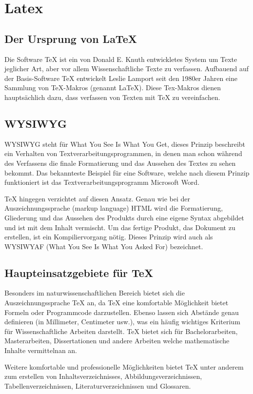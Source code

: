 \chapter{Latex}
    \section{Der Ursprung von LaTeX}
    Die Software TeX ist ein von Donald E. Knuth entwickletes System um Texte jeglicher Art, aber vor allem Wissenschaftliche Texte zu verfassen. Aufbauend auf der Basis-Software TeX entwickelt Leslie Lamport seit den 1980er Jahren eine Sammlung von TeX-Makros (genannt LaTeX). Diese Tex-Makros dienen hauptsächlich dazu, dass verfassen von Texten mit TeX zu vereinfachen.

    \section{WYSIWYG}
    WYSIWYG steht für What You See Is What You Get, dieses Prinzip beschreibt ein Verhalten von Textverarbeitungsprogrammen, in denen man schon während des Verfassens die finale Formatierung und das Aussehen des Textes zu sehen bekommt. Das bekannteste Beispiel für eine Software, welche nach diesem Prinzip funktioniert ist das Textverarbeitungsprogramm Microsoft Word.

    TeX hingegen verzichtet auf diesen Ansatz. Genau wie bei der Auszeichnungssprache (markup language) HTML wird die Formatierung, Gliederung und das Aussehen des Produkts durch eine eigene Syntax abgebildet und ist mit dem Inhalt vermischt. Um das fertige Produkt, das Dokument zu erstellen, ist ein Kompiliervorgang nötig. Dieses Prinzip wird auch als WYSIWYAF (What You See Is What You Asked For) bezeichnet.

    \section{Haupteinsatzgebiete für TeX}
    Besonders im naturwissenschaftlichen Bereich bietet sich die Auszeichnungssprache TeX an, da TeX eine komfortable Möglichkeit bietet Formeln oder Programmcode darzustellen. Ebenso lassen sich Abstände genau definieren (in Millimeter, Centimeter usw.), was ein häufig wichtiges Kriterium für Wissenschaftliche Arbeiten darstellt. TeX bietet sich für Bachelorarbeiten, Masterarbeiten, Dissertationen und andere Arbeiten welche mathematische Inhalte vermittelnan an.

    Weitere komfortable und professionelle Möglichkeiten bietet TeX unter anderem zum erstellen von Inhaltsverzeichnisses, Abbildungsverzeichnissen, Tabellenverzeichnissen, Literaturverzeichnissen und Glossaren.

